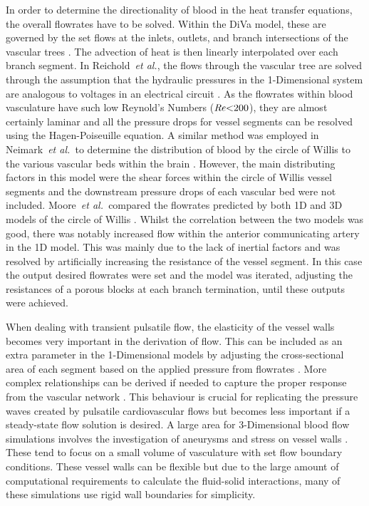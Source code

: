 \documentclass[11pt,english,a4paper,twoside,openright]{report}
\newcommand\Reynolds{\mbox{\textit{Re}}}
\begin{document}
{{{{{{{{	In order to determine the directionality of blood in the heat transfer equations, the overall flowrates have to be solved. Within the DiVa model, these are governed by the set flows at the inlets, outlets, and branch intersections of the vascular trees \cite{kotte1996description}. The advection of heat is then linearly interpolated over each branch segment. In Reichold~\textit{et al.}, the flows through the vascular tree are solved through the assumption that the hydraulic pressures in the 1-Dimensional system are analogous to voltages in an electrical circuit \cite{reichold2009vascular}. As the flowrates within blood vasculature have such low Reynold's Numbers ($\Reynolds{<}200$), they are almost certainly laminar and all the pressure drops for vessel segments can be resolved using the Hagen-Poiseuille equation. A similar method was employed in Neimark~\textit{et al.\ }to determine the distribution of blood by the circle of Willis to the various vascular beds within the brain \cite{neimark2007integration}. However, the main distributing factors in this model were the shear forces within the circle of Willis vessel segments and the downstream pressure drops of each vascular bed were not included. Moore~\textit{et al.\ }compared the flowrates predicted by both 1D and 3D models of the circle of Willis \cite{moore2005one}. Whilst the correlation between the two models was good, there was notably increased flow within the anterior communicating artery in the 1D model. This was mainly due to the lack of inertial factors and was resolved by artificially increasing the resistance of the vessel segment. In this case the output desired flowrates were set and the model was iterated, adjusting the resistances of a porous blocks at each branch termination, until these outputs were achieved.
	
	When dealing with transient pulsatile flow, the elasticity of the vessel walls becomes very important in the derivation of flow. This can be included as an extra parameter in the 1-Dimensional models by adjusting the cross-sectional area of each segment based on the applied pressure from flowrates \cite{sherwin2003one}. More complex relationships can be derived if needed to capture the proper response from the vascular network \cite{reymond2009validation}. This behaviour is crucial for replicating the pressure waves created by pulsatile cardiovascular flows but becomes less important if a steady-state flow solution is desired. A large area for 3-Dimensional blood flow simulations involves the investigation of aneurysms and stress on vessel walls \cite{appanaboyina2009simulation}\cite{steinman2003image}. These tend to focus on a small volume of vasculature with set flow boundary conditions. These vessel walls can be flexible but due to the large amount of computational requirements to calculate the fluid-solid interactions, many of these simulations use rigid wall boundaries for simplicity. 
	
}}}}}}}}
\end{document}
